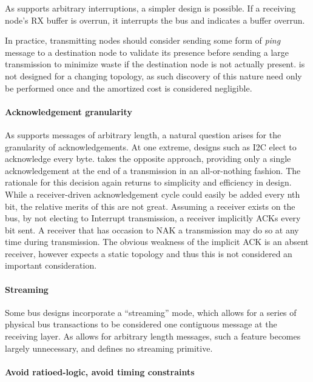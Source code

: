 As \bus supports arbitrary interruptions, a simpler design is possible.
If a receiving node's RX buffer is overrun, it interrupts the bus and
indicates a buffer overrun.

In practice, transmitting nodes should consider sending some form of {\em
ping} message to a destination node to validate its presence before sending a
large transmission to minimize waste if the destination node is not actually
present. \bus is not designed for a changing topology, as such discovery of
this nature need only be performed once and the amortized cost is considered
negligible.

\paragraph{Acknowledgement granularity}
As \bus supports messages of arbitrary length, a natural question arises for
the granularity of acknowledgements. At one extreme, designs such as I2C elect
to acknowledge every byte. \bus takes the opposite approach, providing only a
single acknowledgement at the end of a transmission in an all-or-nothing
fashion. The rationale for this decision again returns to simplicity and
efficiency in design. While a receiver-driven acknowledgement cycle could
easily be added every nth bit, the relative merits of this are not great.
Assuming a receiver exists on the bus, by not electing to Interrupt
transmission, a receiver implicitly ACKs every bit sent. A receiver that has
occasion to NAK a transmission may do so at any time during transmission. The
obvious weakness of the implicit ACK is an absent receiver, however \bus
expects a static topology and thus this is not considered an important
consideration.

\paragraph{Streaming}
Some bus designs incorporate a ``streaming'' mode, which allows for a series
of physical bus transactions to be considered one contiguous message at the
receiving layer. As \bus allows for arbitrary length messages, such a feature
becomes largely unnecessary, and \bus defines no streaming primitive.

\paragraph{Avoid ratioed-logic, avoid timing constraints}

